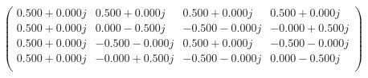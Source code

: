 \documentclass[border=1em]{standalone}
\begin{document}
$
\left(
\begin{array}{cccc}
0.500+0.000j & 0.500+0.000j & 0.500+0.000j & 0.500+0.000j \\
0.500+0.000j & 0.000-0.500j & -0.500-0.000j & -0.000+0.500j \\
0.500+0.000j & -0.500-0.000j & 0.500+0.000j & -0.500-0.000j \\
0.500+0.000j & -0.000+0.500j & -0.500-0.000j & 0.000-0.500j \\
\end{array}
\right)
$
\end{document}
